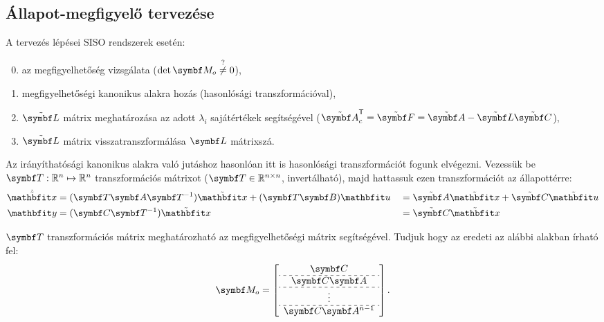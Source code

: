 \subsection{Állapot-megfigyelő tervezése}

A tervezés lépései SISO rendszerek esetén:
\begin{enumerate}[label={\color{darkRed}\theenumi})]
  \setcounter{enumi}{-1}
  \item az megfigyelhetőség vizsgálata ($\det \rmat M_o \overset{?}{\neq} 0$),
  \item megfigyelhetőségi kanonikus alakra hozás (hasonlósági transzformációval),
  \item $\tmat L$ mátrix meghatározása az adott $\lambda_i$ sajátértékek
        segítségével ($\tmat A_c^\T = \tmat F = \tmat A - \tmat L \tmat C$),
  \item $\tmat L$ mátrix visszatranszformálása $\rmat L$ mátrixszá.
\end{enumerate}

Az irányíthatósági kanonikus alakra való jutáshoz hasonlóan itt is hasonlósági
transzformációt fogunk elvégezni. Vezessük be $\rmat T: \mathbb R^n \mapsto
  \mathbb R^n$ transzformációs mátrixot ($\rmat T \in \mathbb R^{n \times n}$,
invertálható), majd hattassuk ezen transzformációt az állapottérre:
\begin{alignat}{9}
	\dot{\tvec x} & = (\rmat T \rmat A \rmat T^{-1}) \tvec x + (\rmat T \rmat B) \rvec u
                && = \tmat A \tvec x + \tmat C \tvec u
	\\
	\rvec y       & = (\rmat C \rmat T^{-1}) \tvec x
                && = \tmat C \tvec x
\end{alignat}

$\rmat T$ transzformációs mátrix meghatározható az megfigyelhetőségi mátrix
segítségével. Tudjuk hogy az eredeti az alábbi alakban írható fel:
\bgroup
\def\arraystretch{1.2}
\begin{equation}
  \rmat M_o = \left[\begin{array}{ c }
      \rmat C         \\ \hdashline[3pt/3pt]
      \rmat C \rmat A \\ \hdashline[3pt/3pt]
      \vdots          \\ \hdashline[3pt/3pt]
      \rmat C \rmat A^{n-1}
    \end{array}\right]
  .
\end{equation}
\egroup

